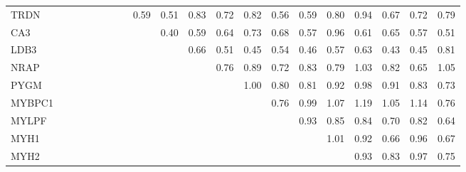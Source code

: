 \begin{longtable}{lrrrrrrrrrrrrrrrrrrr}
TRDN    &             &           &             &               &            &             &            &      0.59 &       0.51 &       0.83 &       0.72 &         0.82 &        0.56 &       0.59 &       0.80 &      0.94 &        0.67 &        0.72 &     0.79 \\
CA3     &             &           &             &               &            &             &            &           &       0.40 &       0.59 &       0.64 &         0.73 &        0.68 &       0.57 &       0.96 &      0.61 &        0.65 &        0.57 &     0.51 \\
LDB3    &             &           &             &               &            &             &            &           &            &       0.66 &       0.51 &         0.45 &        0.54 &       0.46 &       0.57 &      0.63 &        0.43 &        0.45 &     0.81 \\
NRAP    &             &           &             &               &            &             &            &           &            &            &       0.76 &         0.89 &        0.72 &       0.83 &       0.79 &      1.03 &        0.82 &        0.65 &     1.05 \\
PYGM    &             &           &             &               &            &             &            &           &            &            &            &         1.00 &        0.80 &       0.81 &       0.92 &      0.98 &        0.91 &        0.83 &     0.73 \\
MYBPC1  &             &           &             &               &            &             &            &           &            &            &            &              &        0.76 &       0.99 &       1.07 &      1.19 &        1.05 &        1.14 &     0.76 \\
MYLPF   &             &           &             &               &            &             &            &           &            &            &            &              &             &       0.93 &       0.85 &      0.84 &        0.70 &        0.82 &     0.64 \\
MYH1    &             &           &             &               &            &             &            &           &            &            &            &              &             &            &       1.01 &      0.92 &        0.66 &        0.96 &     0.67 \\
MYH2    &             &           &             &               &            &             &            &           &            &            &            &              &             &            &            &      0.93 &        0.83 &        0.97 &     0.75 \\

\end{longtable}
